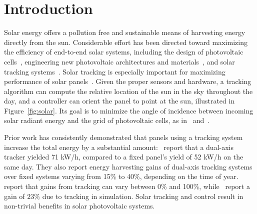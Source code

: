 \documentclass{article}
\begin{document}
\section{Introduction}
Solar energy offers a pollution free and sustainable means of harvesting energy directly from the sun. Considerable effort has been directed toward maximizing the efficiency of end-to-end solar systems, including the design of photovoltaic cells~\cite{Jervase2001,li2012molecular}, engineering new photovoltaic architectures and materials~\cite{li2005high}, and solar tracking systems~\cite{camacho2012control}. Solar tracking is especially important for maximizing performance of solar panels~\cite{Eke2012,Rizk2008,King2001}. Given the proper sensors and hardware, a tracking algorithm can compute the relative location of the sun in the sky throughout the day, and a controller can orient the panel to point at the sun, illustrated in Figure~\ref{fig:solar}. Its goal is to minimize the angle of incidence between incoming solar radiant energy and the grid of photovoltaic cells, as in~\citet{Eke2012,Benghanem2011,King2001} and~\citet{kalogirou1996design}.

Prior work has consistently demonstrated that panels using a tracking system increase the total energy by a substantial amount:~\citet{Eke2012} report that a dual-axis tracker yielded 71 kW/h, compared to a fixed panel's yield of 52 kW/h on the same day. They also report energy harvesting gains of dual-axis tracking systems over fixed systems varying from 15\% to 40\%, depending on the time of year.~\citet{mousazadeh2009review} report that gains from tracking can vary between 0\% and 100\%, while~\citet{clifford2004design} report a gain of $23\%$ due to tracking in simulation. Solar tracking and control result in non-trivial benefits in solar photovoltaic systems.
\end{document}
